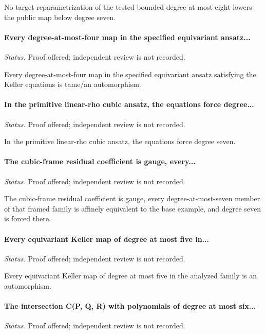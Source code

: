 No target reparametrization of the tested bounded degree at most eight lowers the public map below degree seven.

\label{supp-note-04-009}
\paragraph{Every degree-at-most-four map in the specified equivariant ansatz...}
\emph{Status.} Proof offered; independent review is not recorded.

Every degree-at-most-four map in the specified equivariant ansatz satisfying the Keller equations is tame/an automorphism.

\label{supp-note-04-010}
\paragraph{In the primitive linear-rho cubic ansatz, the equations force degree...}
\emph{Status.} Proof offered; independent review is not recorded.

In the primitive linear-rho cubic ansatz, the equations force degree seven.

\label{supp-note-04-011}
\paragraph{The cubic-frame residual coefficient is gauge, every...}
\emph{Status.} Proof offered; independent review is not recorded.

The cubic-frame residual coefficient is gauge, every degree-at-most-seven member of that framed family is affinely equivalent to the base example, and degree seven is forced there.

\label{supp-note-04-012}
\paragraph{Every equivariant Keller map of degree at most five in...}
\emph{Status.} Proof offered; independent review is not recorded.

Every equivariant Keller map of degree at most five in the analyzed family is an automorphism.

\label{supp-note-04-013}
\paragraph{The intersection C(P, Q, R) with polynomials of degree at most six...}
\emph{Status.} Proof offered; independent review is not recorded.

